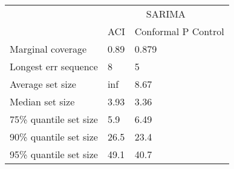 \begin{tabular}{lll}
\toprule
& \multicolumn{2}{c}{SARIMA} \\
& ACI & Conformal P Control \\
\midrule
Marginal coverage & 0.89 & 0.879 \\
Longest err sequence & 8 & 5 \\
Average set size & inf & 8.67 \\
Median set size & 3.93 & 3.36 \\
75\% quantile set size & 5.9 & 6.49 \\
90\% quantile set size & 26.5 & 23.4 \\
95\% quantile set size & 49.1 & 40.7 \\
\bottomrule
\end{tabular}
